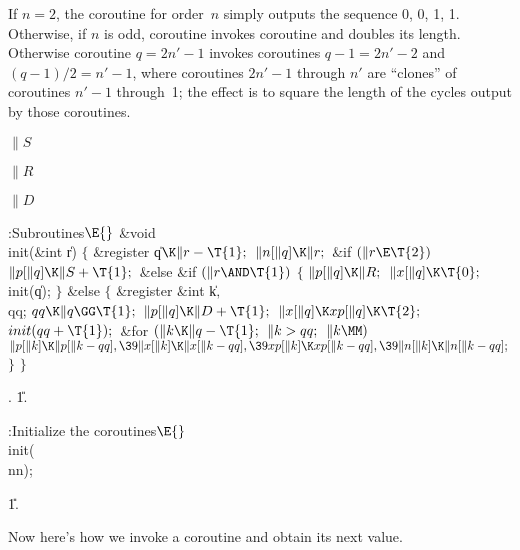 If $n=2$, the coroutine for order~$n$ simply outputs the sequence 0, 0, 1, 1.
Otherwise, if $n$ is odd, coroutine  invokes coroutine
 and doubles its length.
Otherwise coroutine $q=2n'-1$ invokes coroutines
$q-1=2n'-2$ and $(q-1)/2=n'-1$, where coroutines $2n'-1$ through
$n'$ are ``clones'' of coroutines $n'-1$ through~1; the effect
is to square the length of the cycles output by those coroutines.

\Y\B\4\D$\|S$ \5
\par
\B\4\D$\|R$ \5
\par
\B\4\D$\|D$ \5
\par
\Y\B\4:Subroutines\X${}\E{}$\6
\&{void} \\{init}(\&{int} \|r)\1\1\2\2\6
${}\{{}$\1\6
\&{register} \|q${}\K\|r-\T{1};{}$\7
${}\|n[\|q]\K\|r;{}$\6
\&{if} ${}(\|r\E\T{2}){}$\1\5
${}\|p[\|q]\K\|S+\T{1};{}$\2\6
\&{else} \&{if} ${}(\|r\AND\T{1}){}$\5
${}\{{}$\1\6
${}\|p[\|q]\K\|R;{}$\6
${}\|x[\|q]\K\T{0};{}$\6
\\{init}(\|q);\6
\4${}\}{}$\5
\2\&{else}\5
${}\{{}$\1\6
\&{register} \&{int} \|k${},{}$ \\{qq};\7
${}\\{qq}\K\|q\GG\T{1};{}$\6
${}\|p[\|q]\K\|D+\T{1};{}$\6
${}\|x[\|q]\K\\{xp}[\|q]\K\T{2};{}$\6
${}\\{init}(\\{qq}+\T{1});{}$\6
\&{for} ${}(\|k\K\|q-\T{1};{}$ ${}\|k>\\{qq};{}$ ${}\|k\MM){}$\1\5
${}\|p[\|k]\K\|p[\|k-\\{qq}],\39\|x[\|k]\K\|x[\|k-\\{qq}],\39\\{xp}[\|k]\K%
\\{xp}[\|k-\\{qq}],\39\|n[\|k]\K\|n[\|k-\\{qq}];{}$\2\6
\4${}\}{}$\2\6
\4${}\}{}$\2\par
{}.
\U1.\fi

\B{}:Initialize the coroutines\X${}\E{}$\6
\\{init}(\\{nn});\par
\U1.\fi

Now here's how we invoke a coroutine and obtain its next
value.

